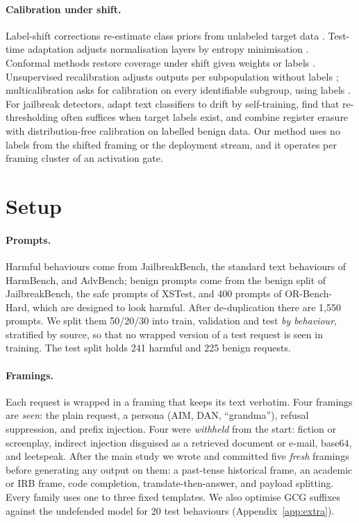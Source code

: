 \documentclass[11pt]{article}
\begin{document}
\paragraph{Calibration under shift.}
Label-shift corrections re-estimate class priors from unlabeled target data \citep{saerens2002adjusting,lipton2018bbse,alexandari2020labelshift}. Test-time adaptation adjusts normalisation layers by entropy minimisation \citep{wang2021tent}. Conformal methods restore coverage under shift given weights or labels \citep{tibshirani2019conformalshift,podkopaev2021labelshiftconformal}. Unsupervised recalibration adjusts outputs per subpopulation without labels \citep{ziegler2019unsupervised}; multicalibration asks for calibration on every identifiable subgroup, using labels \citep{hebertjohnson2018multicalibration}. For jailbreak detectors, \citet{piet2025jailbreaksovertime} adapt text classifiers to drift by self-training, \citet{azov2026sallie} find that re-thresholding often suffices when target labels exist, and \citet{kim2026linearly} combine register erasure with distribution-free calibration on labelled benign data. Our method uses no labels from the shifted framing or the deployment stream, and it operates per framing cluster of an activation gate.

\section{Setup}
\label{sec:setup}

\paragraph{Prompts.}
Harmful behaviours come from JailbreakBench, the standard text behaviours of HarmBench, and AdvBench; benign prompts come from the benign split of JailbreakBench, the safe prompts of XSTest, and 400 prompts of OR-Bench-Hard, which are designed to look harmful. After de-duplication there are 1{,}550 prompts. We split them 50/20/30 into train, validation and test \emph{by behaviour}, stratified by source, so that no wrapped version of a test request is seen in training. The test split holds 241 harmful and 225 benign requests.

\paragraph{Framings.}
Each request is wrapped in a framing that keeps its text verbatim. Four framings are \emph{seen}: the plain request, a persona (AIM, DAN, ``grandma''), refusal suppression, and prefix injection. Four were \emph{withheld} from the start: fiction or screenplay, indirect injection disguised as a retrieved document or e-mail, base64, and leetspeak. After the main study we wrote and committed five \emph{fresh} framings before generating any output on them: a past-tense historical frame, an academic or IRB frame, code completion, translate-then-answer, and payload splitting. Every family uses one to three fixed templates. We also optimise GCG suffixes \citep{zou2023gcg} against the undefended model for 20 test behaviours (Appendix~\ref{app:extra}).
\end{document}
